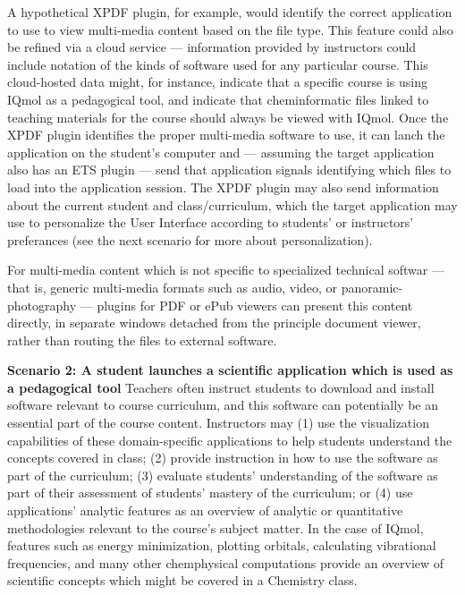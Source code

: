 \documentclass[10pt,letterpaper]{article}
\newcommand{\pseudoIndent}{

\vspace{1pt}\hspace*{38pt}}
\newcommand{\sapp}{\resizebox{!}{8pt}{\AcronymText{Sapien+}}}
\newcommand{\textscc}[1]{{\color{orr!35!black}{{%
						\fontfamily{Cabin-TLF}\fontseries{b}\selectfont{\textsc{\scriptsize{#1}}}}}}}
\newcommand{\AcronymText}[1]{{\textscc{#1}}}
\newenvironment{mldescription}{%
  \begin{addmargin}[4pt]{1em}
    \setlength{\parindent}{-1em}%
    \newcommand*{\mlitem}[1][]{\par\medskip\textbf{##1}\quad}\indent
}{%
  \end{addmargin}
  \medskip
}
\begin{document}
{{\begin{mldescription}
\pseudoIndent{} A hypothetical XPDF plugin, for example, 
would identify the correct application to use to view 
multi-media content based on the file type.  This feature 
could also be refined via a cloud service --- information 
provided by instructors could include notation of the 
kinds of software used for any particular course.  
This cloud-hosted data might, for instance, indicate 
that a specific course is using IQmol as a pedagogical 
tool, and indicate that cheminformatic files linked 
to teaching materials for the course should always be 
viewed with IQmol.  Once the XPDF plugin identifies 
the proper multi-media software to use, it can 
lanch the application on the student's computer and 
--- assuming the target application also has an ETS 
plugin --- send that application signals identifying 
which files to load into the application session.   
The XPDF plugin may also send 
information about the current student and 
class/curriculum, which the target application may use to 
personalize the User Interface according to students' 
or instructors' preferances (see the next scenario 
for more about personalization).

\pseudoIndent{} For multi-media content which is 
not specific to specialized technical softwar 
--- that is, generic multi-media formats such as 
audio, video, or panoramic-photography --- 
\sapp{} plugins for PDF or ePub viewers can present 
this content directly, in separate windows detached 
from the principle document viewer, rather than 
routing the files to external software.   

\mlitem[Scenario 2: A student launches a scientific 
application which is used as a pedagogical tool]  
Teachers often instruct students to download 
and install software relevant to course curriculum, 
and this software can potentially be an essential 
part of the course content.  Instructors may 
(1) use the visualization capabilities of these 
domain-specific applications to help students 
understand the concepts covered in class; 
(2) provide instruction in how to use the 
software as part of the curriculum; 
(3) evaluate students' understanding of the 
software as part of their assessment of 
students' mastery of the curriculum; or 
(4) use applications' analytic features as an 
overview of analytic or quantitative methodologies 
relevant to the course's subject matter.  In 
the case of IQmol, features such as 
energy minimization, plotting orbitals, 
calculating vibrational frequencies, and many 
other chemphysical computations provide an 
overview of scientific concepts which 
might be covered in a Chemistry class. 
 

\end{mldescription}}}
\end{document}
